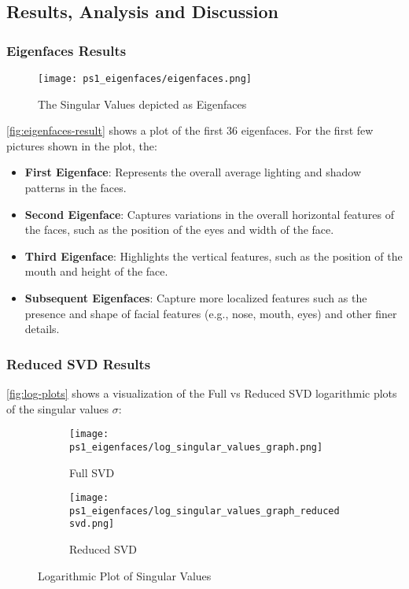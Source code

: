 \documentclass{article} %
\theoremstyle{definition}
\theoremstyle{remark}
\theoremstyle{plain}
\begin{document}
    

\subsection{Results, Analysis and Discussion}
    \subsubsection{Eigenfaces Results}
        \begin{figure}[h!]
            \centering
            \texttt{[image: ps1\_eigenfaces/eigenfaces.png]}
            \caption{The Singular Values depicted as Eigenfaces}
            \label{fig:eigenfaces-result}
        \end{figure}
        
        \autoref{fig:eigenfaces-result} shows a plot of the first 36 eigenfaces. For the first few pictures shown in the plot, the:
        \begin{itemize}[label={--}]
            \item \textbf{First Eigenface}: Represents the overall average lighting and shadow patterns in the faces.
            \item \textbf{Second Eigenface}: Captures variations in the overall horizontal features of the faces, such as the position of the eyes and width of the face.
            \item \textbf{Third Eigenface}: Highlights the vertical features, such as the position of the mouth and height of the face.
            \item \textbf{Subsequent Eigenfaces}: Capture more localized features such as the presence and shape of facial features (e.g., nose, mouth, eyes) and other finer details.
        \end{itemize}
    \subsubsection{Reduced SVD Results}
        \autoref{fig:log-plots} shows a visualization of the Full vs Reduced SVD logarithmic plots of the singular values \(\sigma\):
        \begin{figure}[h!]
            \begin{subfigure}{.5\textwidth}
                \centering
                \texttt{[image: ps1\_eigenfaces/log\_singular\_values\_graph.png]}
                \caption{Full SVD}
                \label{fig:full-svd-plot}
            \end{subfigure}%
            \begin{subfigure}{.5\textwidth}
                \centering
                \texttt{[image: ps1\_eigenfaces/log\_singular\_values\_graph\_reducedsvd.png]}
                \caption{Reduced SVD}
                \label{fig:reduced-svd-plot}
            \end{subfigure}%
        \caption{Logarithmic Plot of Singular Values}
        \label{fig:log-plots}
        \end{figure}
\end{document}
